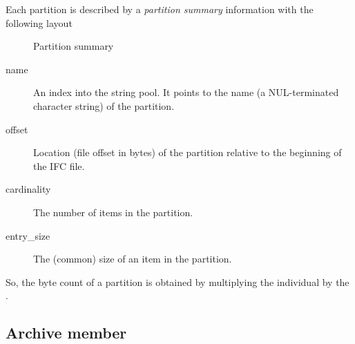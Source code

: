Each partition is described by a \emph{partition summary} information with the
following layout
\begin{figure}[H]
  \centering
  \caption{Partition summary}
  \label{fig:ifc-partition-summary}
\end{figure}

\begin{description}
\item[name] An index into the string pool.  It points to the name (a
  NUL-terminated character string) of the partition.

\item[offset] Location (file offset in bytes) of the partition relative to the
  beginning of the IFC file.

\item[cardinality] The number of items in the partition.

\item[entry\_size] The (common) size of an item in the partition.
\end{description}

So, the byte count of a partition is obtained by multiplying the individual
 by the .

\subsection{Archive member}
\label{sec:ifc-archive-member}

